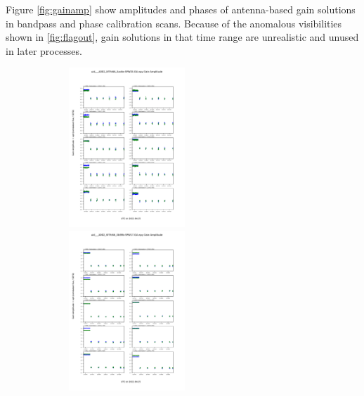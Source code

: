 \documentclass[a4paper, 10pt]{scrartcl}
\begin{document}
Figure \ref{fig:gainamp} show amplitudes and phases of antenna-based gain solutions in bandpass and phase calibration scans. Because of the anomalous visibilities shown in \ref{fig:flagout}, gain solutions in that time range are unrealistic and unused in later processes.

\begin{figure}[h]
	\centering
	\includegraphics[width=7cm,height=6cm]{GA_uid___A002_Xf7fc66_Xac6e-SPW25-amp.pdf} \includegraphics[width=7cm,height=6cm]{GA_uid___A002_Xf7fc66_Xb59b-SPW17-amp.pdf}
	

\end{figure}
\end{document}
